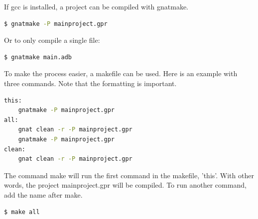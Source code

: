 \noindent If gcc is installed, a project can be compiled with gnatmake.
\begin{lstlisting}[language=bash]
  $ gnatmake -P mainproject.gpr
\end{lstlisting}
\noindent Or to only compile a single file:
\begin{lstlisting}[language=bash]
  $ gnatmake main.adb
\end{lstlisting}

\noindent To make the process easier, a makefile can be used. Here is an example with three commands. Note that the formatting is important.
\begin{lstlisting}[language=bash]
this:
	gnatmake -P mainproject.gpr
all:
	gnat clean -r -P mainproject.gpr
	gnatmake -P mainproject.gpr
clean:
	gnat clean -r -P mainproject.gpr
\end{lstlisting}

\noindent The command make will run the first command in the makefile, 'this'. With other words, the project mainproject.gpr will be compiled. To run another command, add the name after make.
\begin{lstlisting}[language=bash]
  $ make all
\end{lstlisting}

